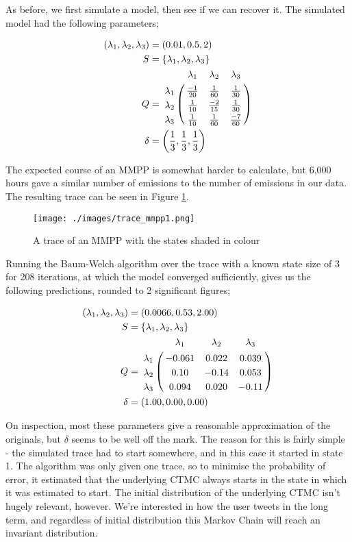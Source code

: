 As before, we first simulate a model, then see if we can recover it. The simulated model had the following parameters;

\begin{align*}
(\lambda_1,\lambda_2,\lambda_3) &= (0.01,0.5,2)\\
S &= \{\lambda_1,\lambda_2,\lambda_3\}\\
Q &= \bordermatrix{      & \lambda_1 & \lambda_2 & \lambda_3\cr
                \lambda_1 & \frac{-1}{20} & \frac{1}{60}  & \frac{1}{30} \cr
                \lambda_2 & \frac{1}{10}  & \frac{-2}{15} & \frac{1}{30} \cr
                \lambda_3 & \frac{1}{10}  & \frac{1}{60}  & \frac{-7}{60}\cr
			}\\
\delta &= \left(\frac{1}{3},\frac{1}{3},\frac{1}{3}\right)
\end{align*}

The expected course of an MMPP is somewhat harder to calculate, but 6,000 hours gave a similar number of emissions to the number of emissions in our data. The resulting trace can be seen in Figure \ref{trace_mmpp1}.

\clearpage
\begin{figure}[h!]
\texttt{[image: ./images/trace\_mmpp1.png]}
\caption{A trace of an MMPP with the states shaded in colour \protect\footnotemark }
\label{trace_mmpp1}
\end{figure}

Running the Baum-Welch algorithm over the trace with a known state size of 3 for 208 iterations, at which the model converged sufficiently, gives us the following predictions, rounded to 2 significant figures;

\begin{align*}
(\lambda_1,\lambda_2,\lambda_3) &= (0.0066,0.53,2.00)\\
S &= \{\lambda_1,\lambda_2,\lambda_3\}\\
Q &= \bordermatrix{      & \lambda_1 & \lambda_2 & \lambda_3\cr
                \lambda_1 & -0.061 & 0.022 & 0.039 \cr
                \lambda_2 & 0.10 & -0.14 & 0.053 \cr
                \lambda_3 & 0.094 & 0.020 & -0.11 \cr
			}\\
\delta &= (1.00,0.00,0.00)
\end{align*}

On inspection, most these parameters give a reasonable approximation of the originals, but $\delta$ seems to be well off the mark. The reason for this is fairly simple - the simulated trace had to start somewhere, and in this case it started in state 1. The algorithm was only given one trace, so to minimise the probability of error, it estimated that the underlying CTMC always starts in the state in which it was estimated to start. The initial distribution of the underlying CTMC isn't hugely relevant, however. We're interested in how the user tweets in the long term, and regardless of initial distribution this Markov Chain will reach an invariant distribution.


